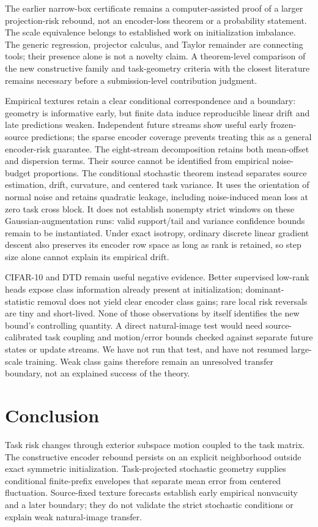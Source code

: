 The earlier narrow-box certificate remains a computer-assisted proof of a larger projection-risk rebound, not an encoder-loss theorem or a probability statement. The scale equivalence belongs to established work on initialization imbalance. The generic regression, projector calculus, and Taylor remainder are connecting tools; their presence alone is not a novelty claim. A theorem-level comparison of the new constructive family and task-geometry criteria with the closest literature remains necessary before a submission-level contribution judgment.

Empirical textures retain a clear conditional correspondence and a boundary: geometry is informative early, but finite data induce reproducible linear drift and late predictions weaken. Independent future streams show useful early frozen-source predictions; the sparse encoder coverage prevents treating this as a general encoder-risk guarantee. The eight-stream decomposition retains both mean-offset and dispersion terms. Their source cannot be identified from empirical noise-budget proportions. The conditional stochastic theorem instead separates source estimation, drift, curvature, and centered task variance. It uses the orientation of normal noise and retains quadratic leakage, including noise-induced mean loss at zero task cross block. It does not establish nonempty strict windows on these Gaussian-augmentation runs: valid support/tail and variance confidence bounds remain to be instantiated. Under exact isotropy, ordinary discrete linear gradient descent also preserves its encoder row space as long as rank is retained, so step size alone cannot explain its empirical drift.

CIFAR-10 and DTD remain useful negative evidence. Better supervised low-rank heads expose class information already present at initialization; dominant-statistic removal does not yield clear encoder class gains; rare local risk reversals are tiny and short-lived. None of those observations by itself identifies the new bound's controlling quantity. A direct natural-image test would need source-calibrated task coupling and motion/error bounds checked against separate future states or update streams. We have not run that test, and have not resumed large-scale training. Weak class gains therefore remain an unresolved transfer boundary, not an explained success of the theory.

\section{Conclusion}
Task risk changes through exterior subspace motion coupled to the task matrix. The constructive encoder rebound persists on an explicit neighborhood outside exact symmetric initialization. Task-projected stochastic geometry supplies conditional finite-prefix envelopes that separate mean error from centered fluctuation. Source-fixed texture forecasts establish early empirical nonvacuity and a later boundary; they do not validate the strict stochastic conditions or explain weak natural-image transfer.

